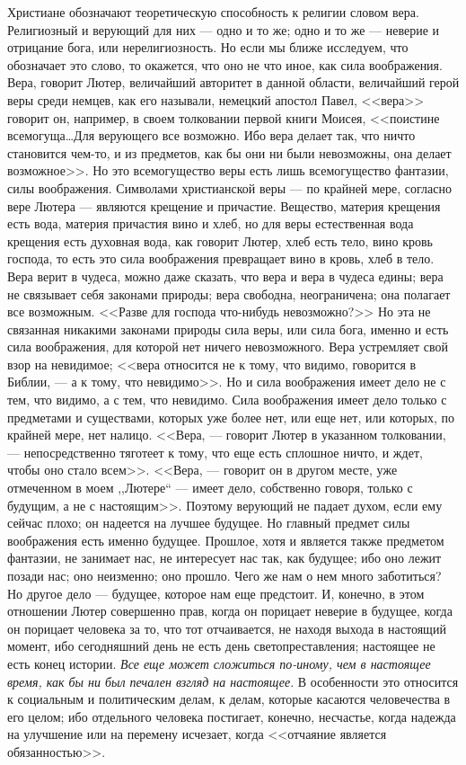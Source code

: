 \documentclass[12pt]{article}
\begin{document}
Христиане обозначают теоретическую способность к религии словом вера. Религиозный и верующий для них --- одно и то же; одно и то же --- неверие и отрицание бога, или нерелигиозность. Но если мы ближе исследуем, что обозначает это слово, то окажется, что оно не что иное, как сила воображения. Вера, говорит Лютер, величайший авторитет в данной области, величайший герой веры среди немцев, как его называли, немецкий апостол Павел, <<вера>>  говорит он, например, в своем толковании первой книги Моисея, <<поистине всемогуща\dots Для верующего все возможно. Ибо вера делает так, что ничто становится чем-то, и из предметов, как бы они ни были невозможны, она делает возможное>>. Но это всемогущество веры есть лишь всемогущество фантазии, силы воображения. Символами христианской веры --- по крайней мере, согласно вере Лютера --- являются крещение и причастие. Вещество, материя крещения есть вода, материя причастия вино и хлеб, но для веры естественная вода крещения есть духовная вода, как говорит Лютер, хлеб есть тело, вино кровь господа, то есть это сила воображения превращает вино в кровь, хлеб в тело. Вера верит в чудеса, можно даже сказать, что вера и вера в чудеса едины; вера не связывает себя законами природы; вера свободна, неограничена; она полагает все возможным. <<Разве для господа что-нибудь невозможно?>> Но эта не связанная никакими законами природы сила веры, или сила бога, именно и есть сила воображения, для которой нет ничего невозможного. Вера устремляет свой взор на невидимое; <<вера относится не к тому, что видимо, говорится в Библии, --- а к тому, что невидимо>>. Но и сила воображения имеет дело не с тем, что видимо, а с тем, что невидимо. Сила воображения имеет дело только с предметами и существами, которых уже более нет, или еще нет, или которых, по крайней мере, нет налицо. <<Вера, --- говорит Лютер в указанном толковании, --- непосредственно тяготеет к тому, что еще есть сплошное ничто, и ждет, чтобы оно стало всем>>. <<Вера, --- говорит он в другом месте, уже отмеченном в моем ,,Лютере``  --- имеет дело, собственно говоря, только с будущим, а не с настоящим>>. Поэтому верующий не падает духом, если ему сейчас плохо; он надеется на лучшее будущее. Но главный предмет силы воображения есть именно будущее. Прошлое, хотя и является также предметом фантазии, не занимает нас, не интересует нас так, как будущее; ибо оно лежит позади нас; оно неизменно; оно прошло. Чего же нам о нем много заботиться? Но другое дело --- будущее, которое нам еще предстоит. И, конечно, в этом отношении Лютер совершенно прав, когда он порицает неверие в будущее, когда он порицает человека за то, что тот отчаивается, не находя выхода в настоящий момент, ибо сегодняшний день не есть день светопреставления; настоящее не есть конец истории. \emph{Все еще может сложиться по-иному, чем в настоящее время, как бы ни был печален взгляд на настоящее}. В особенности это относится к социальным и политическим делам, к делам, которые касаются человечества в его целом; ибо отдельного человека постигает, конечно, несчастье, когда надежда на улучшение или на перемену исчезает, когда <<отчаяние является обязанностью>>. 
\end{document}
